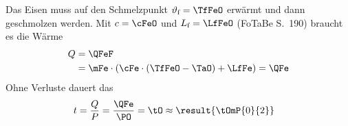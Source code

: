 Das Eisen muss auf den Schmelzpunkt $\vartheta_\text{f} = \TfFeO$ erwärmt und dann geschmolzen werden. Mit $c = \cFeO$ und $L_\text{f} = \LfFeO$ (FoTaBe S.~190) braucht es die Wärme
\begin{align}
 Q &= \QFeF \\
   &= \mFe\cdot\left(\cFe\cdot\left(\TfFeO-\TaO\right)+\LfFe\right) = \QFe
\end{align}
Ohne Verluste dauert das
\begin{align}
 t &= \frac{Q}{P} = \frac{\QFe}{\PO} = \tO \approx \result{\tOmP{0}{2}}
\end{align}
